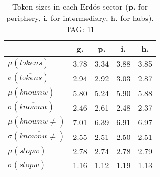 \begin{table}[h!]
\begin{center}
\begin{tabular}{| l | c | c | c | c |}\hline
 & g. & p. & i. & h. \\\hline
$\mu(\overline{tokens})$ & 3.78  & 3.34  & 3.88  & 3.85 \\\hline
$\sigma(\overline{tokens})$ & 2.94  & 2.92  & 3.03  & 2.87 \\\hline
$\mu(\overline{knownw})$ & 5.80  & 5.24  & 5.90  & 5.88 \\\hline
$\sigma(\overline{knownw})$ & 2.46  & 2.61  & 2.48  & 2.37 \\\hline
$\mu(\overline{knownw \neq})$ & 7.01  & 6.39  & 6.91  & 6.97 \\\hline
$\sigma(\overline{knownw \neq})$ & 2.55  & 2.51  & 2.50  & 2.51 \\\hline
$\mu(\overline{stopw})$ & 2.78  & 2.74  & 2.78  & 2.79 \\\hline
$\sigma(\overline{stopw})$ & 1.16  & 1.12  & 1.19  & 1.13 \\\hline
\end{tabular}
\caption{Token sizes in each Erd\"os sector ({{\bf p.}} for periphery, {{\bf i.}} for intermediary, {{\bf h.}} for hubs). TAG: 11}
\end{center}
\end{table}